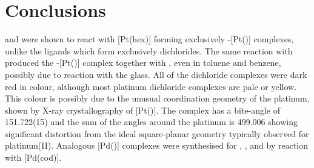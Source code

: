 



\section{Conclusions}

\tBuXantphos{} and \tButhixantphos{} were shown to react with [Pt(\acrshort{hex})] forming exclusively \trans-[Pt(\tBuxantphos)] complexes, unlike the \Phxantphos{} ligands which form exclusively \cis{} dichlorides.  The same reaction with \tBuSixantphos{} produced the \trans{}-[Pt(\tBusixantphos)] complex together with \tBusixantphos{}, even in toluene and benzene, possibly due to reaction with the glass.  All of the dichloride complexes were dark red in colour, although most platinum dichloride complexes are pale or yellow.  This colour is possibly due to the unusual coordination geometry of the platinum, shown by X-ray crystallography of [Pt(\tButhixantphos)].  The complex has a bite-angle of 151.722(15)\degrees{} and the sum of the angles around the platinum is 499.006\degrees{} showing significant distortion from the ideal square-planar geometry typically observed for platinum(II).  Analogous [Pd(\tBuxantphos)] complexes were synthesised for \tBusixantphos, \tButhixantphos, and \tBuxantphos{} by reaction with [Pd(cod)].  

